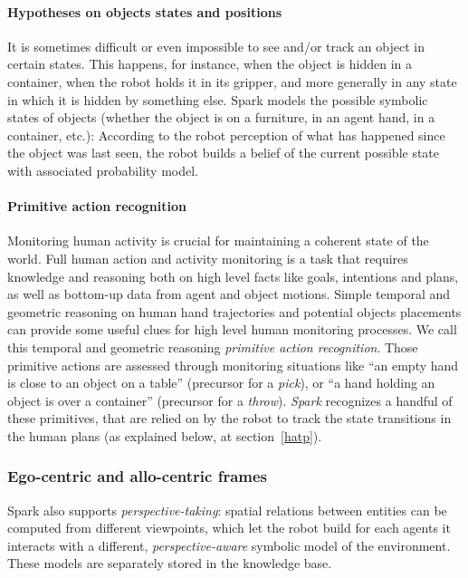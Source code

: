 \documentclass[preprint,3p,times]{elsarticle}
\begin{document}
\paragraph{Hypotheses on objects states and positions}

It is sometimes difficult or even impossible to see and/or track an object in
certain states. This happens, for instance, when the object is hidden in a
container, when the robot holds it in its gripper, and more generally in any
state in which it is hidden by something else. {\sc Spark} models the possible
symbolic states of objects (whether the object is on a furniture, in an agent
hand, in a container, etc.): According to the robot perception of what has
happened since the object was last seen, the robot builds a belief of the
current possible state with associated probability model.

\paragraph{Primitive action recognition}

Monitoring human activity is crucial for maintaining a coherent state of the
world. Full human action and activity monitoring is a task that requires
knowledge and reasoning both on high level facts like goals, intentions and
plans, as well as bottom-up data from agent and object motions. Simple temporal
and geometric reasoning on human hand trajectories and potential objects
placements can provide some useful clues for high level human monitoring
processes. We call this temporal and geometric reasoning \emph{primitive action
recognition}. Those primitive actions are assessed through monitoring situations
like ``an empty hand is close to an object on a table'' (precursor for a
\emph{pick}), or ``a hand holding an object is over a container'' (precursor for
a \emph{throw}). \emph{Spark} recognizes a handful  of these
primitives, that are relied on by the robot to track the state transitions in
the human plans (as explained below, at section~\ref{hatp}).

\subsubsection{Ego-centric and allo-centric frames}

{\sc Spark} also supports \emph{perspective-taking}: spatial relations between entities can
be computed from different viewpoints, which let the robot build for each
agents it interacts with a different, \emph{perspective-aware} symbolic model
of the environment. These models are separately stored in the knowledge base.
\end{document}
